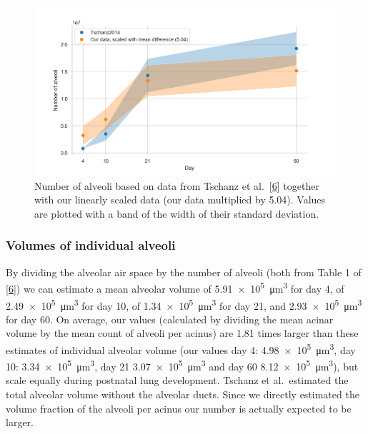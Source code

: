 \documentclass[
  american,
]{article}
\begin{document}
\begin{figure}
\hypertarget{fig:08}{%
\centering
\includegraphics{images/fig08.png}
\caption{Number of alveoli based on data from Tschanz et al.~{[}\protect\hyperlink{ref-wnl86DEM}{6}{]} together with our linearly scaled data (our data multiplied by 5.04).
Values are plotted with a band of the width of their standard deviation.}\label{fig:08}
}
\end{figure}

\hypertarget{volumes-of-individual-alveoli}{%
\subsubsection{Volumes of individual alveoli}\label{volumes-of-individual-alveoli}}

By dividing the alveolar air space by the number of alveoli (both from Table 1 of {[}\protect\hyperlink{ref-wnl86DEM}{6}{]}) we can estimate a mean alveolar volume of 5.91~×~10\textsuperscript{5}~μm\textsuperscript{3} for day 4, of 2.49~×~10\textsuperscript{5}~μm\textsuperscript{3} for day 10, of 1.34~×~10\textsuperscript{5}~μm\textsuperscript{3} for day 21, and 2.93~×~10\textsuperscript{5}~μm\textsuperscript{3} for day 60.
On average, our values (calculated by dividing the mean acinar volume by the mean count of alveoli per acinus) are 1.81 times larger than these estimates of individual alveolar volume (our values day 4: 4.98~×~10\textsuperscript{5}~μm\textsuperscript{3}, day 10: 3.34~×~10\textsuperscript{5}~μm\textsuperscript{3}, day 21 3.07~×~10\textsuperscript{5}~μm\textsuperscript{3} and day 60 8.12~×~10\textsuperscript{5}~μm\textsuperscript{3}), but scale equally during postnatal lung development.
Tschanz et al.~estimated the total alveolar volume without the alveolar ducts.
Since we directly estimated the volume fraction of the alveoli per acinus our number is actually expected to be larger.
\end{document}
